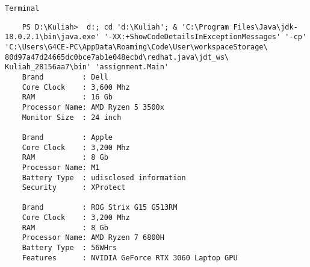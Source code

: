 \documentclass[12pt,titlepage]{article}
\begin{document}
\texttt{Terminal}
\begin{verbatim}
    PS D:\Kuliah>  d:; cd 'd:\Kuliah'; & 'C:\Program Files\Java\jdk-18.0.2.1\bin\java.exe' '-XX:+ShowCodeDetailsInExceptionMessages' '-cp' 'C:\Users\G4CE-PC\AppData\Roaming\Code\User\workspaceStorage\ 80d97a47d24665dc0bce7ab1e048ecbd\redhat.java\jdt_ws\ Kuliah_28156aa7\bin' 'assignment.Main' 
    Brand         : Dell
    Core Clock    : 3,600 Mhz
    RAM           : 16 Gb
    Processor Name: AMD Ryzen 5 3500x
    Monitor Size  : 24 inch

    Brand         : Apple
    Core Clock    : 3,200 Mhz
    RAM           : 8 Gb
    Processor Name: M1
    Battery Type  : udisclosed information
    Security      : XProtect

    Brand         : ROG Strix G15 G513RM
    Core Clock    : 3,200 Mhz
    RAM           : 8 Gb
    Processor Name: AMD Ryzen 7 6800H
    Battery Type  : 56WHrs
    Features      : NVIDIA GeForce RTX 3060 Laptop GPU
\end{verbatim}
\end{document}
